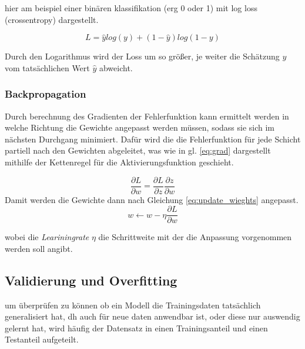 hier am beispiel einer binären klassifikation (erg 0 oder 1) mit log loss
 (crossentropy) dargestellt.

 \begin{equation}
    \label{eq:crossentropy}
    L = \hat{y}log(y) + (1 - \hat{y})log(1 - y)
\end{equation}

Durch den Logarithmus wird der Loss um so größer, je weiter die Schätzung $y$ vom 
tatsächlichen Wert $\hat{y}$ abweicht.


\subsubsection{Backpropagation}
Durch berechnung des Gradienten der Fehlerfunktion kann ermittelt 
werden in welche Richtung die Gewichte angepasst werden müssen, sodass sie sich 
im nächsten Durchgang minimiert.
Dafür wird die die Fehlerfunktion für jede Schicht partiell nach den 
Gewichten abgeleitet, was wie in gl. \ref{eq:grad} dargestellt mithilfe der 
Kettenregel für die Aktivierungsfunktion geschieht.


\begin{equation}
    \label{eq:grad}
    \frac{\partial L}{\partial w} = \frac{\partial L}{\partial z}\frac{\partial z}{\partial w}
\end{equation}
Damit werden die Gewichte dann nach Gleichung \ref{eq:update_wieghts} angepasst.
\begin{equation}
    \label{eq:update_wieghts}
    w  \leftarrow w - \eta \frac{\partial L}{\partial w}
\end{equation}

wobei die \textit{Leariningrate} $\eta$ die Schrittweite mit der die Anpassung vorgenommen
werden soll angibt.








\subsection{Validierung und Overfitting}\label{subsec:validation}

um überprüfen zu können ob ein Modell die Trainingsdaten tatsächlich generalisiert 
hat, dh auch für neue daten anwendbar ist, oder diese nur auswendig gelernt hat, 
wird häufig der Datensatz in einen Trainingsanteil und einen Testanteil aufgeteilt.

